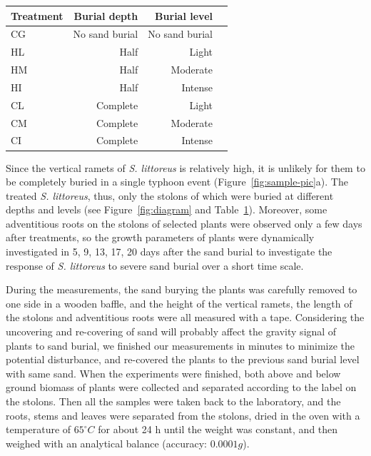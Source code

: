 \documentclass[]{interact}
\theoremstyle{plain}%
\theoremstyle{definition}
\theoremstyle{remark}
\begin{document}
\begin{table}
  {\begin{tabular}{lrrr} 
  \toprule
   Treatment & Burial depth & Burial level \\ 
  \midrule
   CG & No sand burial & No sand burial \\
   HL & Half & Light \\
   HM & Half & Moderate \\
   HI & Half & Intense \\
   CL & Complete & Light \\
   CM & Complete & Moderate \\
   CI & Complete & Intense \\
  \bottomrule
  \end{tabular}}
  \label{tab:treatment}
\end{table}

Since the vertical ramets of \textit{S. littoreus} is relatively high, it is unlikely for them to be completely buried in a single typhoon event (Figure~\ref{fig:sample-pic}a). The treated \textit{S. littoreus}, thus, only the stolons of which were buried at different depths and levels (see Figure~\ref{fig:diagram} and Table~\ref{tab:treatment}). Moreover, some adventitious roots on the stolons of selected plants were observed only a few days after treatments, so the growth parameters of plants were dynamically investigated in 5, 9, 13, 17, 20 days after the sand burial to investigate the response of \textit{S. littoreus} to severe sand burial over a short time scale.

During the measurements, the sand burying the plants was carefully removed to one side in a wooden baffle, and the height of the vertical ramets, the length of the stolons and adventitious roots were all measured with a tape. Considering the uncovering and re-covering of sand will probably affect the gravity signal of plants to sand burial, we finished our measurements in minutes to minimize the potential disturbance, and re-covered the plants to the previous sand burial level with same sand. When the experiments were finished, both above and below ground biomass of plants were collected and separated according to the label on the stolons. Then all the samples were taken back to the laboratory, and the roots, stems and leaves were separated from the stolons, dried in the oven with a temperature of $65^{\circ}C$ for about 24 h until the weight was constant, and then weighed with an analytical balance (accuracy: $0.0001g$).
\end{document}
